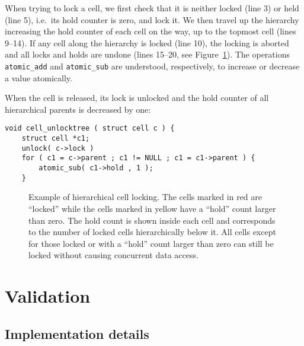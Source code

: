 \documentclass[final]{siamltex}
\newcommand{\fig}[1]
    {Figure~\ref{fig:#1}}
\begin{document}
\noindent When trying to lock a cell, we first check that it is neither
locked (line 3) or held (line 5), i.e.~its hold counter is zero, and lock it.
We then travel up the hierarchy increasing the 
hold counter of each cell on the way, up to the topmost cell (lines 9--14).
If any cell along the hierarchy is locked (line 10), the locking is aborted
and all locks and holds are undone (lines 15--20, see \fig{CellLocking}).
The operations {\tt atomic\_add} and {\tt atomic\_sub} are understood,
respectively, to increase or decrease a value atomically.

When the cell is released, its lock is unlocked and the hold
counter of all hierarchical parents is decreased by one:

\begin{center}\begin{minipage}{0.8\textwidth}
    \begin{lstlisting}
void cell_unlocktree ( struct cell c ) {
    struct cell *c1;
    unlock( c->lock )
    for ( c1 = c->parent ; c1 != NULL ; c1 = c1->parent ) {
        atomic_sub( c1->hold , 1 );
    }
    \end{lstlisting}
\end{minipage}\end{center}


\begin{figure}[ht]
    \centerline{}
    
    \caption{Example of hierarchical cell locking. The cells marked in red
        are ``locked'' while the cells marked in yellow have a ``hold'' count
        larger than zero.
        The hold count is shown inside each cell and corresponds to the number
        of locked cells hierarchically below it.
        All cells except for those locked or with a ``hold'' count larger than
        zero can still be locked without causing concurrent data access.
        }
    \label{fig:CellLocking}
\end{figure}


\section{Validation}

\subsection{Implementation details}
\end{document}
